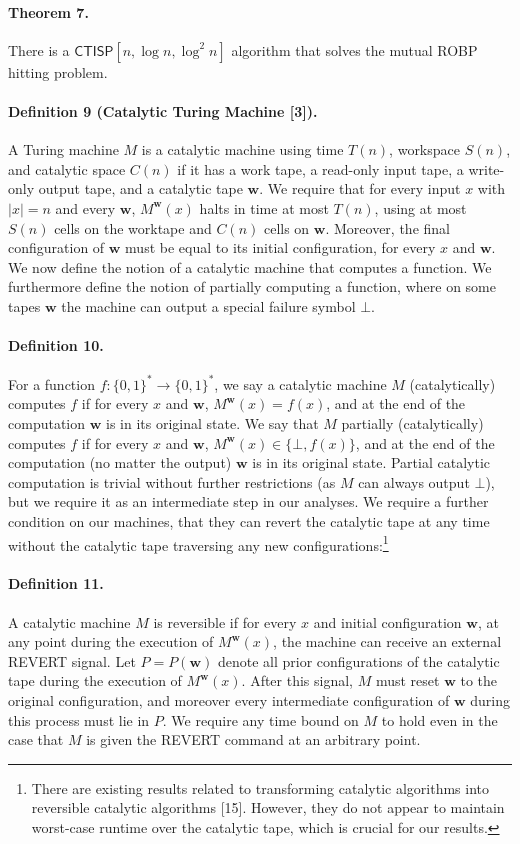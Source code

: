 \documentclass[10pt,a4paper]{article}
\begin{document}
\paragraph{Theorem 7.} There is a $\mathsf{CTISP}[n,\log n,\log^2 n]$ algorithm that solves the mutual ROBP hitting problem.

\paragraph{Definition 9 (Catalytic Turing Machine [3]).} A Turing machine $M$ is a catalytic machine using time $T(n)$, workspace $S(n)$, and catalytic space $C(n)$ if it has a work tape, a read-only input tape, a write-only output tape, and a catalytic tape $\mathbf{w}$. We require that for every input $x$ with $|x|=n$ and every $\mathbf{w}$, $M^{\mathbf{w}}(x)$ halts in time at most $T(n)$, using at most $S(n)$ cells on the worktape and $C(n)$ cells on $\mathbf{w}$. Moreover, the final configuration of $\mathbf{w}$ must be equal to its initial configuration, for every $x$ and $\mathbf{w}$.
We now define the notion of a catalytic machine that computes a function. We furthermore define the notion of partially computing a function, where on some tapes $\mathbf{w}$ the machine can output a special failure symbol $\bot$.
\paragraph{Definition 10.} For a function $f:\{0,1\}^*\to\{0,1\}^*$, we say a catalytic machine $M$ (catalytically) computes $f$ if for every $x$ and $\mathbf{w}$, $M^{\mathbf{w}}(x)=f(x)$, and at the end of the computation $\mathbf{w}$ is in its original state. We say that $M$ partially (catalytically) computes $f$ if for every $x$ and $\mathbf{w}$, $M^{\mathbf{w}}(x)\in\{\bot,f(x)\}$, and at the end of the computation (no matter the output) $\mathbf{w}$ is in its original state.
Partial catalytic computation is trivial without further restrictions (as $M$ can always output $\bot$), but we require it as an intermediate step in our analyses. We require a further condition on our machines, that they can revert the catalytic tape at any time without the catalytic tape traversing any new configurations:\footnote{There are existing results related to transforming catalytic algorithms into reversible catalytic algorithms [15]. However, they do not appear to maintain worst-case runtime over the catalytic tape, which is crucial for our results.}
\paragraph{Definition 11.} A catalytic machine $M$ is reversible if for every $x$ and initial configuration $\mathbf{w}$, at any point during the execution of $M^{\mathbf{w}}(x)$, the machine can receive an external REVERT signal. Let $P=P(\mathbf{w})$ denote all prior configurations of the catalytic tape during the execution of $M^{\mathbf{w}}(x)$. After this signal, $M$ must reset $\mathbf{w}$ to the original configuration, and moreover every intermediate configuration of $\mathbf{w}$ during this process must lie in $P$. We require any time bound on $M$ to hold even in the case that $M$ is given the REVERT command at an arbitrary point.
\end{document}
